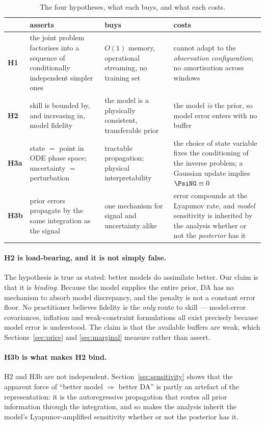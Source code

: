 \begin{table}[t]
\centering
\small
\begin{tabular}{@{}p{}p{}p{}p{}@{}}
\toprule
& \textbf{asserts} & \textbf{buys} & \textbf{costs} \\
\midrule
\textbf{H1} & the joint problem factorises into a sequence of conditionally
independent simpler ones & $O(1)$ memory, operational streaming, no training set
& cannot adapt to the \emph{observation configuration}; no amortisation across
windows \\[0.4em]
\textbf{H2} & skill is bounded by, and increasing in, model fidelity & the model
is a physically consistent, transferable prior & the model \emph{is} the prior,
so model error enters with no buffer \\[0.4em]
\textbf{H3a} & state $=$ point in ODE phase space; uncertainty $=$ perturbation
& tractable propagation; physical interpretability & the choice of state
variable fixes the conditioning of the inverse problem; a Gaussian update
implies $\PsiNG \equiv 0$ \\[0.4em]
\textbf{H3b} & prior errors propagate by the same integration as the signal & one
mechanism for signal and uncertainty alike & error compounds at the Lyapunov
rate, and \emph{model} sensitivity is inherited by the analysis whether or not
the \emph{posterior} has it \\
\bottomrule
\end{tabular}
\caption{The four hypotheses, what each buys, and what each costs.}
\label{tab:hypotheses}
\end{table}

\paragraph{H2 is load-bearing, and it is not simply false.}
The hypothesis is true as stated: better models do assimilate better. Our claim
is that it is \emph{binding}. Because the model supplies the entire prior, DA has
no mechanism to absorb model discrepancy, and the penalty is not a constant error
floor. No practitioner believes fidelity is the \emph{only} route to skill ---
model-error covariances, inflation and weak-constraint formulations all exist
precisely because model error is understood. The claim is that the available
buffers are weak, which Sections~\ref{sec:price} and \ref{sec:marginal} measure
rather than assert.

\paragraph{H3b is what makes H2 bind.}
H2 and H3b are not independent. Section~\ref{sec:sensitivity} shows that the
apparent force of ``better model $\Rightarrow$ better DA'' is partly an artefact
of the representation: it is the autoregressive propagation that routes all
prior information through the integration, and so makes the analysis inherit the
model's Lyapunov-amplified sensitivity whether or not the posterior has it.

